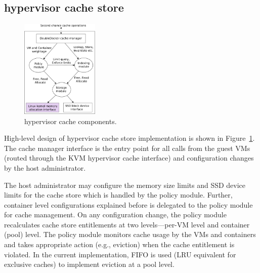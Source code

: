 \subsection{\dd{} hypervisor cache store}
\begin{figure}[t]
  \centering
\includegraphics[width=0.33\textwidth]{images/ddecker} 
 \caption{\dd{} hypervisor cache components. 
  }%
 \vspace{-0.5cm} 
 \label{fig:cachestore} 
\end{figure}
%
High-level design of \dd{} hypervisor cache store implementation 
is shown in Figure~\ref{fig:cachestore}.
%
The \dd{} cache manager interface is the entry point for all 
calls from the guest VMs (routed through the KVM hypervisor
cache interface) and configuration changes by the host administrator.
%

The host administrator may configure the memory size limits and SSD device 
limits for the \dd{} cache store which is handled by the
policy module.
%
Further, container level configurations explained before is
delegated to the policy module for cache management. 
%
On any configuration change, the policy module recalculates cache store
entitlements at two levels---per-VM level and container (pool) level.
%
The policy module monitors \dd{} cache usage by the VMs and containers and
takes appropriate action (e.g., eviction) when the cache entitlement is
violated.
%
In the current implementation, FIFO is used (LRU equivalent for exclusive caches)
to implement eviction at a pool level.
%
 
%

